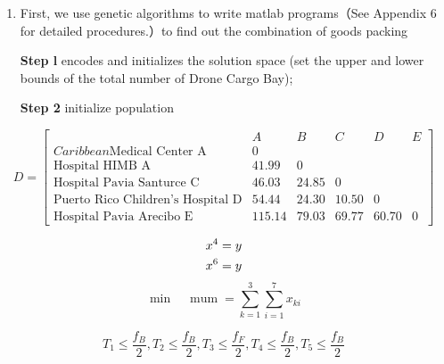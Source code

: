\documentclass[a4paper,12pt]{article}
\begin{document}
	\begin{enumerate}
		\item First, we use genetic algorithms to write matlab programs（See Appendix 6 for detailed
		procedures.）to find out the combination of goods packing
		
		\textbf{Step l} encodes and initializes the solution space (set the upper and lower bounds of the
		total number of Drone Cargo Bay);
		
		\textbf{Step 2} initialize population
	\end{enumerate}
	\begin{equation}
	D=\left[\begin{array}{cccccc}
	{}  & {A} & {B} & {C} & {D} & {E} \\
	{Caribbean  \text {Medical Center A}}  & {0} & {} & {} & {} & {} \\
	{\text {Hospital HIMB A}}  & {41.99} & {0} & {} & {} & {}  \\
	{\text {Hospital Pavia Santurce C}} & {46.03} & {24.85} & {0} & {}  & {} \\
	{\text {Puerto Rico Children's Hospital D}}  & {54.44} & {24.30} & {10.50} & {0} & {} \\
	 {\text {Hospital Pavia Arecibo E} } & {115.14} & {79.03} & {69.77} & {60.70} & {0}
	\end{array}\right]
	\end{equation}
	
	\begin{align}
		x^4 & = y \notag \\
		x^6 & = y
	\end{align}
	\begin{equation}
	\min \quad \operatorname{mum}=\sum_{k=1}^{3} \sum_{i=1}^{7} x_{k i}
	\end{equation}
	
	\begin{equation}
	T_{1} \leq \frac{f_{B}}{2}, T_{2} \leq \frac{f_{B}}{2}, T_{3} \leq \frac{f_{F}}{2}, T_{4} \leq \frac{f_{B}}{2}, T_{5} \leq \frac{f_{B}}{2}
	\end{equation}
\end{document}

